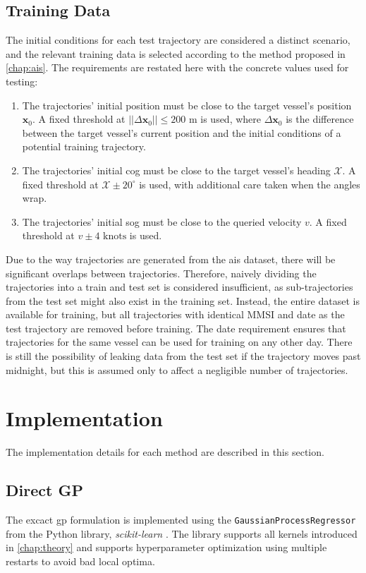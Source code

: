 \subsection{Training Data}
The initial conditions for each test trajectory are considered a distinct scenario, and the relevant training data is selected according to the method proposed in \cref{chap:ais}. The requirements are restated here with the concrete values used for testing:

\begin{enumerate}
    \item The trajectories' initial position must be close to the target vessel's position $\boldsymbol{x}_0$. A fixed threshold at $||\Delta \boldsymbol{x}_0|| \leq 200 \text{ m}$ is used, where $\Delta \boldsymbol{x}_0$ is the difference between the target vessel's current position and the initial conditions of a potential training trajectory.
    \item The trajectories' initial \acrshort{cog} must be close to the target vessel's heading $\mathcal{X}$. A fixed threshold at $\mathcal{X} \pm 20^\circ$ is used, with additional care taken when the angles wrap.
    \item The trajectories' initial \acrshort{sog} must be close to the queried velocity $v$. A fixed threshold at $v \pm 4 \text{ knots}$ is used.
\end{enumerate}

Due to the way trajectories are generated from the \acrshort{ais} dataset, there will be significant overlaps between trajectories. Therefore, naively dividing the trajectories into a train and test set is considered insufficient, as sub-trajectories from the test set might also exist in the training set. Instead, the entire dataset is available for training, but all trajectories with identical MMSI and date as the test trajectory are removed before training. The date requirement ensures that trajectories for the same vessel can be used for training on any other day. There is still the possibility of leaking data from the test set if the trajectory moves past midnight, but this is assumed only to affect a negligible number of trajectories.


\section{Implementation}
The implementation details for each method are described in this section.

\subsection{Direct GP}
The excact \acrshort{gp} formulation is implemented using the \texttt{GaussianProcessRegressor} from the Python library, \textit{scikit-learn} \cite{scikit-learn}. The library supports all kernels introduced in \cref{chap:theory} and supports hyperparameter optimization using multiple restarts to avoid bad local optima.

